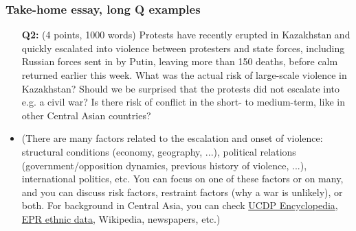 \documentclass[aspectratio=43]{beamer}
\begin{document}
\begin{frame}
\frametitle{Take-home essay, long Q examples}
\centering

\begin{itemize}\small
  \item[\textbf{Q2:}] (4 points, 1000 words) Protests have recently erupted in Kazakhstan and quickly escalated into violence between protesters and state forces, including Russian forces sent in by Putin, leaving more than 150 deaths, before calm returned earlier this week. What was the actual risk of large-scale violence in Kazakhstan? Should we be surprised that the protests did not escalate into e.g. a civil war? Is there risk of conflict in the short- to medium-term, like in other Central Asian countries?
\end{itemize}


\begin{itemize}
  \item ({\footnotesize There are many factors related to the escalation and onset of violence: structural conditions (economy, geography, ...), political relations (government/opposition dynamics, previous history of violence, ...), international politics, etc. You can focus on one of these factors or on many, and you can discuss risk factors, restraint factors (why a war is unlikely), or both. For background in Central Asia, you can check  \href{https://ucdp.uu.se/}{UCDP Encyclopedia}, \href{https://growup.ethz.ch/atlas/}{EPR ethnic data}, Wikipedia, newspapers, etc.})
\end{itemize}

\end{frame}
\end{document}

